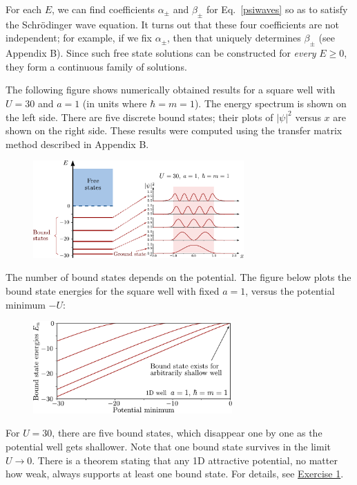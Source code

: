 \documentclass[pra,12pt]{revtex4}
\begin{document}
For each $E$, we can find coefficients $\alpha_\pm$ and $\beta_\pm$
for Eq.~\eqref{psiwaves} so as to satisfy the Schr\"odinger wave
equation.  It turns out that these four coefficients are not
independent; for example, if we fix $\alpha_\pm$, then that uniquely
determines $\beta_\pm$ (see Appendix B).  Since such free
state solutions can be constructed for \textit{every} $E \ge 0$, they
form a continuous family of solutions.

The following figure shows numerically obtained results for a square
well with $U = 30$ and $a=1$ (in units where $\hbar = m =1$).  The
energy spectrum is shown on the left side.  There are five discrete
bound states; their plots of $|\psi|^2$ versus $x$ are shown on the
right side.  These results were computed using the transfer matrix
method described in Appendix B.

\begin{figure}[h]
  \centering\includegraphics[width=0.72\textwidth]{boundvsextended}
\end{figure}

\clearpage
The number of bound states depends on the potential.  The figure below
plots the bound state energies for the square well with fixed $a = 1$,
versus the potential minimum $-U$:

\vskip 0.15in
\begin{figure}[h]
  \centering\includegraphics[width=0.68\textwidth]{boundstate1d}
\end{figure}

\noindent
For $U = 30$, there are five bound states, which disappear one by one
as the potential well gets shallower.  Note that one bound state
survives in the limit $U \rightarrow 0$.  There is a theorem stating
that any 1D attractive potential, no matter how weak, always supports
at least one bound state.  For details, see
\hyperref[ex:boundstate]{Exercise 1}.
\end{document}
